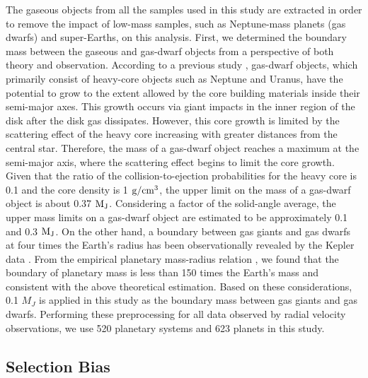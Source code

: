 \documentclass[twocolumn, dvipdfmx]{aastex62}
\begin{document}
\begin{CJK*}{UTF8}{min}
The gaseous objects from all the samples used in this study are extracted in order to remove the impact of low-mass samples, such as Neptune-mass planets (gas dwarfs) and super-Earths, on this analysis. First, we determined the boundary mass between the gaseous and gas-dwarf objects from a perspective of both theory and observation. According to a previous study \citep{2004ApJ...604..388I}, gas-dwarf objects, which primarily consist of heavy-core objects such as Neptune and Uranus, have the potential to grow to the extent allowed by the core building materials inside their semi-major axes. This growth occurs via giant impacts in the inner region of the disk after the disk gas dissipates. However, this core growth is limited by the scattering effect of the heavy core increasing with greater distances from the central star. Therefore, the mass of a gas-dwarf object reaches a maximum at the semi-major axis, where the scattering effect begins to limit the core growth. Given that the ratio of the collision-to-ejection probabilities for the heavy core is 0.1 and the core density is 1 $\rm g/cm^3$, the upper limit on the mass of a gas-dwarf object is about 0.37 $\rm M_J$. Considering a factor of the solid-angle average, the upper mass limits on a gas-dwarf object are estimated to be approximately 0.1 and 0.3 $\rm M_J$. On the other hand, a boundary between gas giants and gas dwarfs at four times the Earth's radius has been observationally revealed by the Kepler data \citep{2012Natur.486..375B}. From the empirical planetary mass-radius relation \cite{2013ApJ...768...14W}, we found that the boundary of planetary mass is less than 150 times the Earth's mass and consistent with the above theoretical estimation. Based on these considerations, 0.1 $M_J$ is applied in this study as the boundary mass between gas giants and gas dwarfs. Performing these preprocessing for all data observed by radial velocity observations, we use 520 planetary systems and 623 planets in this study.


\subsection{Selection Bias} \label{subsec:bias}


\end{CJK*}
\end{document}

